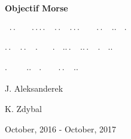 \documentclass[12pt]{report}
\begin{document}
\begin{titlepage}
    \begin{center}

		\vspace*{5cm}    

        \Huge
        \textbf{Objectif Morse}
        
        \vspace*{0.5cm}

		\Large

		\textbf{
		\text{-}\text{-}\text{-} \,			%
		$\cdot\cdot$\text{-} \,\,\,\,\,\,	%
		$\cdot\cdot\cdot\cdot$ \,			%
		$\cdot\cdot$ \,						%
		$\cdot\cdot\cdot$ \,				%
		\text{-} \,							%
		\text{-}\text{-}\text{-} \,			%
		$\cdot\cdot$ \,						%
		$\cdot$\text{-}$\cdot$ \,			%
		$\cdot$}							%
		
		\textbf{
		\text{-}$\cdot\cdot$ \,				%
		$\cdot\cdot$\text{-} \,				%
		\text{-}$\cdot$ \,\,\,\,\,\,		%
		$\cdot$\text{-} \,					%
		$\cdot$\text{-}$\cdot\cdot$ \, 		%
		$\cdot$\text{-}$\cdot\cdot$ \, 		%
		$\cdot$ \,							%
		$\cdot$\text{-}$\cdot$}				%
		
		\textbf{
		$\cdot$ \,							%
		\text{-} \,\,\,\,\,\,				%
		$\cdot$\text{-}$\cdot$	\,			%
		$\cdot$ \,							%
		\text{-} \,							%
		\text{-}\text{-}\text{-} \,			%
		$\cdot\cdot$\text{-} \,				%
		$\cdot$\text{-}$\cdot$}				%
		

        \vspace{2cm}
        
        \LARGE
        J. Aleksanderek
        
        K. Zdybal

        \vspace{8.5cm}
        
		\Large

 		October, 2016 - October, 2017
	\end{center}
\end{titlepage}
\end{document}
